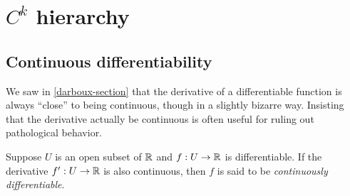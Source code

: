 \section{\texorpdfstring{$C^k$}{Ck} hierarchy} 

\subsection{Continuous differentiability}

We saw in \cref{darboux-section} that the derivative of a differentiable function is always ``close'' to being continuous, though in a slightly bizarre way. Insisting that the derivative actually be continuous is often useful for ruling out pathological behavior. 

\begin{definition} 
	Suppose $U$ is an open subset of $\mathbb{R}$ and $f : U \to \mathbb{R}$ is differentiable. If the derivative $f' : U \to \mathbb{R}$ is also continuous, then $f$ is said to be \emph{continuously differentiable}. 
\end{definition}

